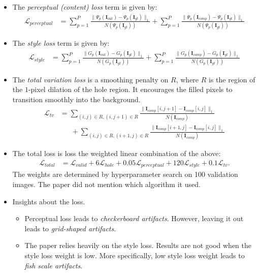 \documentclass[10pt]{article}
\newcommand{\ve}[1]{\mathbf{#1}}
\begin{document}
\begin{itemize}
\begin{itemize}
      \item The \emph{perceptual (content) loss} term is given by:
      \begin{align*}
        \mathcal{L}_{perceptual}
        &= \sum_{p=1}^P \frac{\| \Psi_p(\ve{I}_{out}) - \Psi_p(\ve{I}_{gt}) \|_1}{N(\Psi_p(\ve{I}_{gt}))}
        + \sum_{p=1}^P \frac{\| \Psi_p(\ve{I}_{comp}) - \Psi_p(\ve{I}_{gt}) \|_1}{N(\Psi_p(\ve{I}_{gt}))}
      \end{align*}

      \item The \emph{style loss} term is given by:
      \begin{align*}
        \mathcal{L}_{style}
        &= \sum_{p=1}^P \frac{\| G_p(\ve{I}_{out}) - G_p(\ve{I}_{gt}) \|_1 }{N(G_p(\ve{I}_{gt}))}
        + \sum_{p=1}^P \frac{\| G_p(\ve{I}_{comp}) - G_p(\ve{I}_{gt}) \|_1 }{N(G_p(\ve{I}_{gt}))}
      \end{align*}

      \item The \emph{total variation loss} is a smoothing penalty on $R$, where $R$ is the region of the $1$-pixel dilation of the hole region. It encourages the filled pixels to transition smoothly into the background.
      \begin{align*}
        \mathcal{L}_{tv}
        &= \sum_{(i,j) \in R, (i,j+1)\in R}
        \frac{ \|\ve{I}_{comp}[i,j+1] - \ve{I}_{comp}[i,j] \|_1 }{N(\ve{I}_{comp})} \\
        &\phantom{=\ } + \sum_{(i,j) \in R, (i+1,j)\in R}
        \frac{ \|\ve{I}_{comp}[i+1,j] - \ve{I}_{comp}[i,j] \|_1 }{N(\ve{I}_{comp})}
      \end{align*}

      \item The total loss is loss the weighted linear combination of the above:
      \begin{align*}
        \mathcal{L}_{total}
        &= \mathcal{L}_{valid}
        + 6\mathcal{L}_{hole}
        + 0.05\mathcal{L}_{perceptual}
        + 120 \mathcal{L}_{style}
        + 0.1\mathcal{L}_{tv}.
      \end{align*}
      The weights are determined by hyperparameter search on 100 validation images. The paper did not mention which algorithm it used.

      \item Insights about the loss.
      \begin{itemize}
        \item Perceptual loss leads to \emph{checkerboard artifacts}. However, leaving it out leads to \emph{grid-shaped artifacts}.
        \item The paper relies heavily on the style loss. Results are not good when the style loss weight is low. More specifically, low style loss weight leads to \emph{fish scale artifacts}.
      \end{itemize}      
    \end{itemize}
  \end{itemize}
\end{document}
